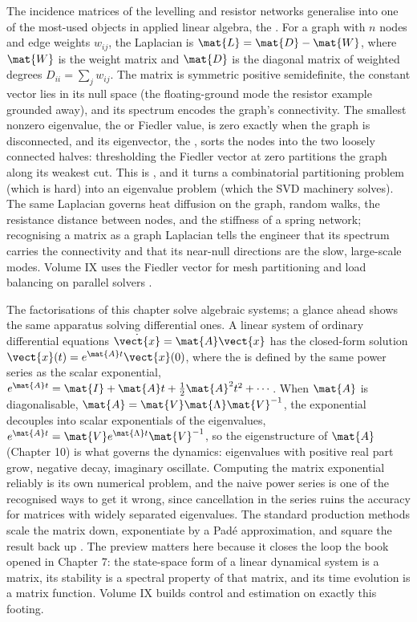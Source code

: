 \begin{mastery}
The incidence matrices of the levelling and resistor networks
generalise into one of the most-used objects in applied linear
algebra, the . For a graph with $n$ nodes and
edge weights $w_{ij}$, the Laplacian is $\mat{L} = \mat{D} - \mat{W}$,
where $\mat{W}$ is the weight matrix and $\mat{D}$ is the diagonal
matrix of weighted degrees $D_{ii} = \sum_{j} w_{ij}$. The matrix is
symmetric positive semidefinite, the constant vector lies in its null
space (the floating-ground mode the resistor example grounded away),
and its spectrum encodes the graph's connectivity. The smallest
nonzero eigenvalue, the  or Fiedler
value, is zero exactly when the graph is disconnected, and its
eigenvector, the , sorts the nodes into the
two loosely connected halves: thresholding the Fiedler vector at zero
partitions the graph along its weakest cut. This is , and it turns a combinatorial partitioning problem (which
is hard) into an eigenvalue problem (which the SVD machinery solves).
The same Laplacian governs heat diffusion on the graph, random walks,
the resistance distance between nodes, and the stiffness of a spring
network; recognising a matrix as a graph Laplacian tells the engineer
that its spectrum carries the connectivity and that its near-null
directions are the slow, large-scale modes. Volume IX uses the Fiedler
vector for mesh partitioning and load balancing on parallel solvers
\cite[ch.~9]{text:v2ch09-golub-vanloan2013}.
\end{mastery}

\begin{mastery}
The factorisations of this chapter solve algebraic systems; a glance
ahead shows the same apparatus solving differential ones. A linear
system of ordinary differential equations $\dot{\vect{x}} = \mat{A}
\vect{x}$ has the closed-form solution $\vect{x}(t) = e^{\mat{A}t}
\vect{x}(0)$, where the  is defined by the
same power series as the scalar exponential, $e^{\mat{A}t} = \mat{I} +
\mat{A}t + \tfrac{1}{2}\mat{A}^{2}t^{2} + \cdots$. When $\mat{A}$ is
diagonalisable, $\mat{A} = \mat{V}\mat{\Lambda}\mat{V}^{-1}$, the
exponential decouples into scalar exponentials of the eigenvalues,
$e^{\mat{A}t} = \mat{V}e^{\mat{\Lambda}t}\mat{V}^{-1}$, so the
eigenstructure of $\mat{A}$ (Chapter 10) is what governs the dynamics:
eigenvalues with positive real part grow, negative decay, imaginary
oscillate. Computing the matrix exponential reliably is its own
numerical problem, and the naive power series is one of the recognised
ways to get it wrong, since cancellation in the series ruins the
accuracy for matrices with widely separated eigenvalues. The standard
production methods scale the matrix down, exponentiate by a Pad\'e
approximation, and square the result back up
\cite{text:v2ch10-higham-functions2008}. The preview matters here
because it closes the loop the book opened in Chapter 7: the
state-space form of a linear dynamical system is a matrix, its
stability is a spectral property of that matrix, and its time
evolution is a matrix function. Volume IX builds control and
estimation on exactly this footing.
\end{mastery}

